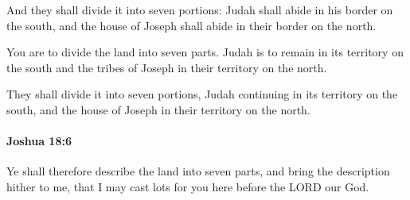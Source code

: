 			\begin{versebox}
					\item[BHS] 
					\item[ASV] And they shall divide it into seven portions: Judah shall abide in his border on the south, and the house of Joseph shall abide in their border on the north.
					\item[NIV] You are to divide the land into seven parts. Judah is to remain in its territory on the south and the tribes of Joseph in their territory on the north.
					\item[NRSV] They shall divide it into seven portions, Judah continuing in its territory on the south, and the house of Joseph in their territory on the north.
			\end{versebox}

		\paragraph{Joshua 18:6} %
			\label{JOSHUA-18-6}

			Ye shall therefore describe the land into seven parts, and bring the description hither to me, that I may cast lots for you here before the LORD our God.

